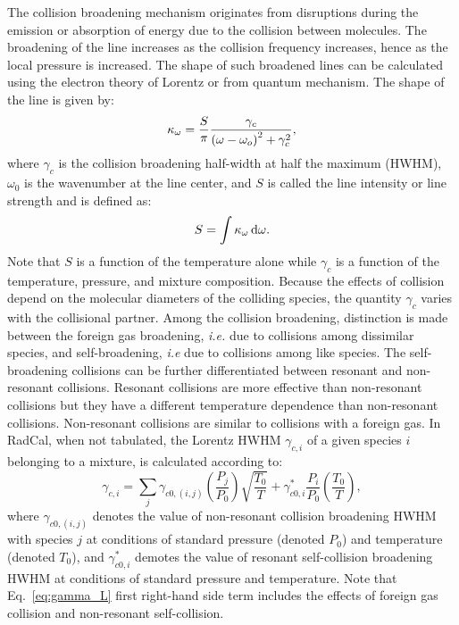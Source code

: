 The collision broadening mechanism originates from disruptions during the emission or absorption of energy due to the collision between molecules. The broadening of the line increases as the collision frequency increases, hence as the local pressure is increased. The shape of such broadened lines can be calculated using the electron theory of Lorentz or from quantum mechanism. The shape of the line is given by:
\begin{equation}\label{eq:lorentz_line}
 \kappa_{\omega} = \dfrac{S}{\pi}\dfrac{\gamma_c}{\left( \omega - \omega_o\right)^2 + \gamma_c^2},
\end{equation}
where $\gamma_c$ is the collision broadening half-width at half the maximum (HWHM), $\omega_0$ is the wavenumber at the line center, and $S$ is called the line intensity or line strength and is defined as:
\begin{equation}
 S = \displaystyle\int{\kappa_{\ensuremath{\omega}} \,\mathrm{d}\ensuremath{\omega}}.
\end{equation}
Note that $S$ is a function of the temperature alone while $\gamma_c$ is a function of the temperature, pressure, and mixture composition. Because the effects of collision depend on the molecular diameters of the colliding species, the quantity $\gamma_c$ varies with the collisional partner. Among the collision broadening, distinction is made between the foreign gas broadening, \textit{i.e.} due to collisions among dissimilar species, and self-broadening, \textit{i.e} due to collisions among like species. The self-broadening collisions can be further differentiated between resonant and non-resonant collisions. Resonant collisions are more effective than non-resonant collisions but they have a different temperature dependence than non-resonant collisions. Non-resonant collisions are similar to collisions with a foreign gas. In RadCal, when not tabulated, the Lorentz HWHM $\gamma_{c,i}$ of a given species $i$ belonging to a mixture, is calculated according to:
\begin{equation}\label{eq:gamma_L}
 \gamma_{c,i} = \displaystyle\sum_{j} \gamma_{c0,(i,j)} \left(\dfrac{P_j}{P_0}\right)\displaystyle\sqrt{\dfrac{T_0}{T}} + \gamma^*_{c0,i}\dfrac{P_i}{P_0}\left(\dfrac{T_0}{T}\right),
\end{equation}
where $\gamma_{c0,(i,j)}$ denotes the value of non-resonant collision broadening HWHM with species $j$ at conditions of standard pressure (denoted $P_0$) and temperature (denoted $T_0$), and $\gamma^*_{c0,i}$ demotes the value of resonant self-collision broadening HWHM at conditions of standard pressure and temperature. Note that Eq.~\ref{eq:gamma_L} first right-hand side term includes the effects of foreign gas collision and non-resonant self-collision.

